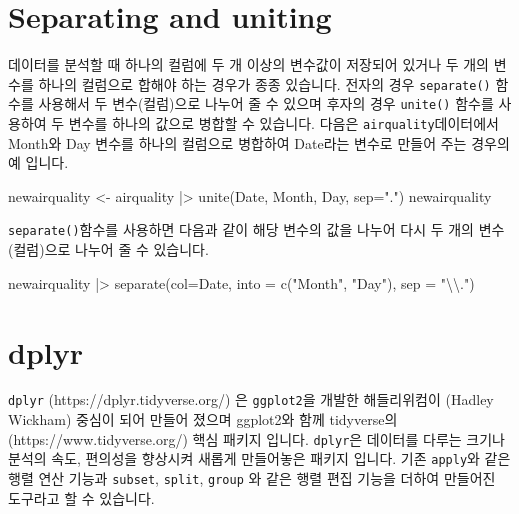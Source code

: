 \documentclass[
  a4paper,
]{book}
\newenvironment{Shaded}{\begin{snugshade}}{\end{snugshade}}
\newcommand{\AttributeTok}[1]{\textcolor[rgb]{0.40,0.45,0.13}{#1}}
\newcommand{\FunctionTok}[1]{\textcolor[rgb]{0.28,0.35,0.67}{#1}}
\newcommand{\NormalTok}[1]{\textcolor[rgb]{0.00,0.23,0.31}{#1}}
\newcommand{\OtherTok}[1]{\textcolor[rgb]{0.00,0.23,0.31}{#1}}
\newcommand{\SpecialCharTok}[1]{\textcolor[rgb]{0.37,0.37,0.37}{#1}}
\newcommand{\StringTok}[1]{\textcolor[rgb]{0.13,0.47,0.30}{#1}}
\begin{document}
\hypertarget{separating-and-uniting}{%
\section{Separating and uniting}\label{separating-and-uniting}}

데이터를 분석할 때 하나의 컬럼에 두 개 이상의 변수값이 저장되어 있거나
두 개의 변수를 하나의 컬럼으로 합해야 하는 경우가 종종 있습니다. 전자의
경우 \texttt{separate()} 함수를 사용해서 두 변수(컬럼)으로 나누어 줄 수
있으며 후자의 경우 \texttt{unite()} 함수를 사용하여 두 변수를 하나의
값으로 병합할 수 있습니다. 다음은 \texttt{airquality}데이터에서 Month와
Day 변수를 하나의 컬럼으로 병합하여 Date라는 변수로 만들어 주는 경우의
예 입니다.

\begin{Shaded}
\begin{Highlighting}[]
\NormalTok{newairquality }\OtherTok{\textless{}{-}}\NormalTok{ airquality }\SpecialCharTok{|\textgreater{}} 
  \FunctionTok{unite}\NormalTok{(Date, Month, Day, }\AttributeTok{sep=}\StringTok{"."}\NormalTok{)}
\NormalTok{newairquality}
\end{Highlighting}
\end{Shaded}

\texttt{separate()}함수를 사용하면 다음과 같이 해당 변수의 값을 나누어
다시 두 개의 변수(컬럼)으로 나누어 줄 수 있습니다.

\begin{Shaded}
\begin{Highlighting}[]
\NormalTok{newairquality }\SpecialCharTok{|\textgreater{}} 
  \FunctionTok{separate}\NormalTok{(}\AttributeTok{col=}\NormalTok{Date, }\AttributeTok{into =} \FunctionTok{c}\NormalTok{(}\StringTok{"Month"}\NormalTok{, }\StringTok{"Day"}\NormalTok{), }\AttributeTok{sep =} \StringTok{"}\SpecialCharTok{\textbackslash{}\textbackslash{}}\StringTok{."}\NormalTok{)}
\end{Highlighting}
\end{Shaded}

\hypertarget{dplyr}{%
\section{dplyr}\label{dplyr}}

\texttt{dplyr} (https://dplyr.tidyverse.org/) 은 \texttt{ggplot2}을
개발한 해들리위컴이 (Hadley Wickham) 중심이 되어 만들어 졌으며 ggplot2와
함께 tidyverse의 (https://www.tidyverse.org/) 핵심 패키지 입니다.
\texttt{dplyr}은 데이터를 다루는 크기나 분석의 속도, 편의성을 향상시켜
새롭게 만들어놓은 패키지 입니다. 기존 \texttt{apply}와 같은 행렬 연산
기능과 \texttt{subset}, \texttt{split}, \texttt{group} 와 같은 행렬 편집
기능을 더하여 만들어진 도구라고 할 수 있습니다.
\end{document}
